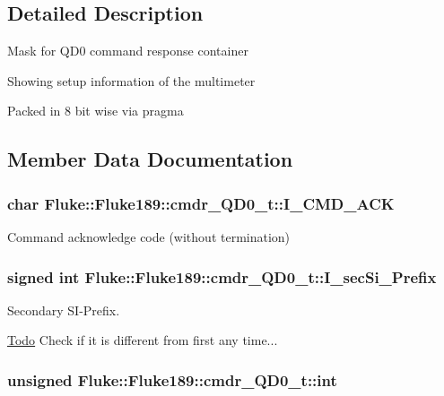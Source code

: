 \subsection{Detailed Description}
Mask for QD0 command response container\par
 Showing setup information of the multimeter\par
 Packed in 8 bit wise via pragma\par
 

\subsection{Member Data Documentation}
\hypertarget{structFluke_1_1Fluke189_1_1cmdr__QD0__t_ab46dd039cec29950bccb5090537d6272}{
\subsubsection[{I\_\-CMD\_\-ACK}]{\setlength{\rightskip}{0pt plus 5cm}char {\bf Fluke::Fluke189::cmdr\_\-QD0\_\-t::I\_\-CMD\_\-ACK}}}
\label{structFluke_1_1Fluke189_1_1cmdr__QD0__t_ab46dd039cec29950bccb5090537d6272}
Command acknowledge code (without termination) \hypertarget{structFluke_1_1Fluke189_1_1cmdr__QD0__t_a3bc502dcc711f5c308028b588e57e226}{
\subsubsection[{I\_\-secSi\_\-Prefix}]{\setlength{\rightskip}{0pt plus 5cm}signed {\bf int} {\bf Fluke::Fluke189::cmdr\_\-QD0\_\-t::I\_\-secSi\_\-Prefix}}}
\label{structFluke_1_1Fluke189_1_1cmdr__QD0__t_a3bc502dcc711f5c308028b588e57e226}


Secondary SI-\/Prefix. \begin{Desc}
\item[\hyperlink{todo__todo000015}{Todo}]Check if it is different from first any time... \end{Desc}
\hypertarget{structFluke_1_1Fluke189_1_1cmdr__QD0__t_a6ab6a1621f14f0fe83e89daadd9ba787}{
\subsubsection[{int}]{\setlength{\rightskip}{0pt plus 5cm}unsigned {\bf Fluke::Fluke189::cmdr\_\-QD0\_\-t::int}}}
\label{structFluke_1_1Fluke189_1_1cmdr__QD0__t_a6ab6a1621f14f0fe83e89daadd9ba787}


